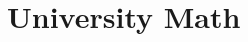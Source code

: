 \documentclass[../mathematics_cheat_sheet.tex]{subfiles}
\begin{document}
\part{University Math}




\end{document}
